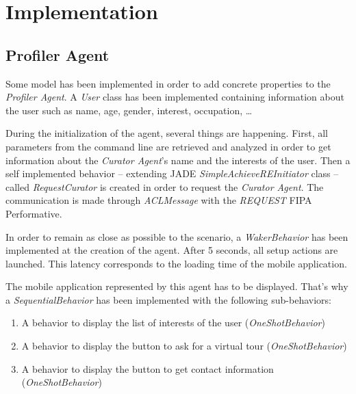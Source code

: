 \documentclass[a4paper,11pt]{article}
\begin{document}
  \newcommand{\pa}{\textit{Profiler Agent}}
  \newcommand{\cu}{\textit{Curator Agent}}
  \renewcommand{\to}{\textit{Tour Guide Agent}}
  
  \section{Implementation}
  
  
  \subsection{Profiler Agent}
  
  Some model has been implemented in order to add concrete properties to the \pa{}. A \textit{User} class has been implemented containing information 
  about the user such as name, age, gender, interest, occupation, \dots{}
  
  During the initialization of the agent, several things are happening. First, all parameters from the command line are retrieved and analyzed in order 
  to get information about the \cu{}'s name and the interests of the user. Then a self implemented behavior -- extending JADE \textit{SimpleAchieveREInitiator} 
  class -- called \textit{RequestCurator} is created in order to request the \cu{}. The communication is made through \textit{ACLMessage} with the \textit{REQUEST} 
  FIPA Performative.
  
  In order to remain as close as possible to the scenario, a \textit{WakerBehavior} has been implemented at the creation of the agent. After 5 seconds, 
  all setup actions are launched. This latency corresponds to the loading time of the mobile application.
  
  The mobile application represented by this agent has to be displayed. That's why a \textit{SequentialBehavior} has been implemented with the following 
  sub-behaviors:
  \vspace{-15pt}
  \begin{enumerate}
   \item A behavior to display the list of interests of the user (\textit{OneShotBehavior})
   \item A behavior to display the button to ask for a virtual tour (\textit{OneShotBehavior})
   \item A behavior to display the button to get contact information (\textit{OneShotBehavior})
  \end{enumerate}
  
\end{document}
